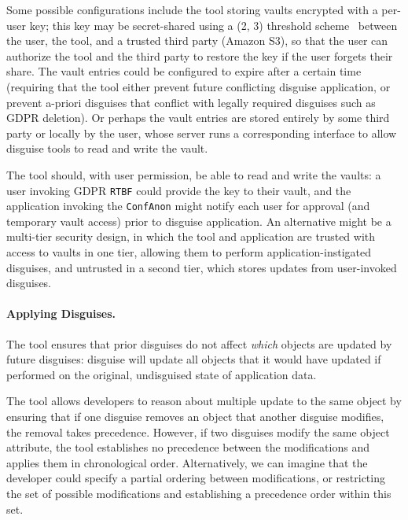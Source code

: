 %
Some possible configurations include the tool storing vaults encrypted with a per-user key; this key
may be secret-shared using a (2, 3) threshold scheme~\cite{secretsharing} between the user, the
tool, and a trusted third party (\eg Amazon S3), so that the user can authorize the tool and the
third party to restore the key if the user forgets their share. 
%
The vault entries could be configured to expire after a certain time (requiring that the tool either
prevent future conflicting disguise application, or prevent a-priori disguises that conflict with
legally required disguises such as GDPR deletion). 
%
Or perhaps the vault entries are stored entirely by some third party or locally by the user, whose
server runs a corresponding interface to allow disguise tools to read and write the vault.

The tool should, with user permission, be able to read and write the vaults: a user invoking GDPR
\texttt{RTBF} could provide the key to their vault, and the application invoking the
\texttt{ConfAnon} might notify each user for approval (and temporary vault access) prior to disguise
application. An alternative might be a multi-tier security design, in which the tool and application
are trusted with access to vaults in one tier, allowing them to perform application-instigated
disguises, and untrusted in a second tier, which stores updates from user-invoked disguises.


\paragraph{Applying Disguises.}
The tool ensures that prior disguises do not affect \emph{which} objects are updated by future
disguises: disguise will update all objects that it would have updated if performed on the original,
undisguised state of application data. 

The tool allows developers to reason about multiple update to the same object by ensuring that 
if one disguise removes an object that another disguise modifies, the removal takes
precedence.
%
However, if two disguises modify the same object attribute, the tool
establishes no precedence between the modifications and applies them in chronological order.
Alternatively, we can imagine that the developer could specify a partial ordering between
modifications, or restricting the set of possible modifications and establishing a precedence order
within this set.

